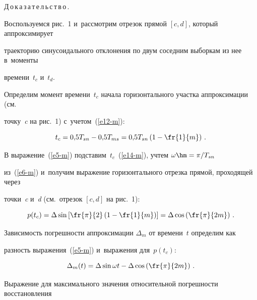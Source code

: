   Д\,о\,к\,а\,з\,а\,т\,е\,л\,ь\,с\,т\,в\,о\,.\ \


  Воспользуемся рис.~1 и~рассмотрим отрезок прямой $[c, d]$, который аппроксимирует 


траекторию синусоидального отклонения по двум соседним выборкам из нее в~моменты 


времени~$t_c$ и~$t_d$.


  


  Определим момент времени~$t_c$ начала горизонтального участка аппроксимации (см.\ 


точку~\textit{c} на рис.~1) с~учетом~(\ref{e12-m}): 


  \begin{equation}


  t_c=0{,}5T_{sn}-0{,}5T_{ms}=0{,}5 T_{sn}\left(1-\fr{1}{m}\right)\,.


  \label{e14-m}


  \end{equation}


  


  В выражение~(\ref{e5-m}) подставим~$t_c$~(\ref{e14-m}), учтем $\omega\hm=\pi/T_{sn}$ 


из~(\ref{e6-m}) и~получим  выражение горизонтального отрезка прямой, проходящей через 


точки~\textit{c} и~\textit{d} (см.\ отрезок $[c, d]$ на рис.~1):


  $$


  p(t_c)=\Delta\sin \left[ \fr{\pi}{2}\left( 1-\fr{1}{m}\right)\right] =\Delta \cos\left( 


\fr{\pi}{2m}\right)\,.


  $$


  


  Зависимость погрешности аппроксимации $\Delta_m$ от времени~$t$ определим как 


разность выражения~(\ref{e5-m}) и~выражения для~$p(t_c)$:


  \begin{equation}


  \Delta_m(t)=\Delta\sin\omega t-\Delta \cos\left( \fr{\pi}{2m}\right)\,.


  \label{e15-m}


  \end{equation}


  


  Выражение для максимального значения относительной погрешности восстановления 


